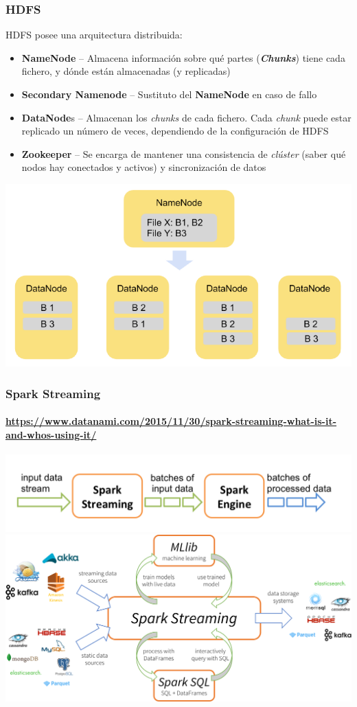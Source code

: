 \documentclass[14pt]{beamer}
\begin{document}
\begin{frame}[allowframebreaks]
  \frametitle{HDFS}
HDFS posee una arquitectura distribuida:
    \begin{itemize}
    \item {\bf NameNode} -- Almacena información sobre qué partes
      ({\bfseries\itshape Chunks}) tiene cada fichero, y dónde están
      almacenadas (y replicadas)
    \item {\bf Secondary Namenode} -- Sustituto del {\bf NameNode} en caso
      de fallo
    \item {\bf DataNode}s -- Almacenan los {\em chunks\/} de cada fichero.
      Cada {\em chunk} puede estar replicado un número de veces,
      dependiendo de la configuración de HDFS
    \item {\bf Zookeeper} -- Se encarga de mantener una consistencia de
      {\em clúster} (saber qué nodos hay conectados y activos) y
      sincronización de datos
    \end{itemize}
  \includegraphics[width=\textwidth]{img/hdfs1}
\end{frame}

\begin{frame}
  \frametitle{Spark Streaming}
  \framesubtitle{\url{https://www.datanami.com/2015/11/30/spark-streaming-what-is-it-and-whos-using-it/}}
  \includegraphics[width=\textwidth]{img/streaming-flow}\\
\vspace*{-.5em}
  \includegraphics[width=\textwidth]{img/spark-streaming-datanami}
\end{frame}
\end{document}
